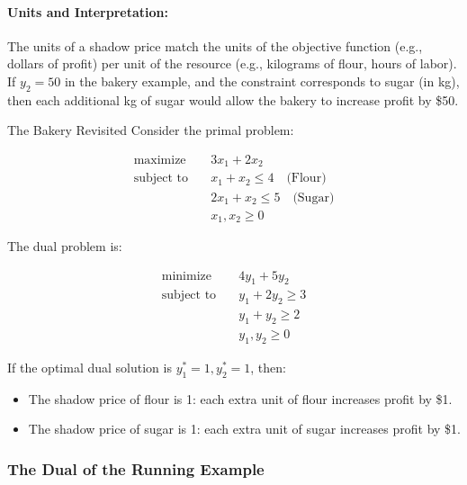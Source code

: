 \paragraph{Units and Interpretation:}
The units of a shadow price match the units of the objective function (e.g., dollars of profit) per unit of the resource (e.g., kilograms of flour, hours of labor). If $y_2 = 50$ in the bakery example, and the constraint corresponds to sugar (in kg), then each additional kg of sugar would allow the bakery to increase profit by \$50.

\begin{example}{The Bakery Revisited}{}
Consider the primal problem:

$$
\begin{aligned}
\text{maximize} \quad & 3x_1 + 2x_2 \\
\text{subject to} \quad
& x_1 + x_2 \leq 4 \quad \text{(Flour)} \\
& 2x_1 + x_2 \leq 5 \quad \text{(Sugar)} \\
& x_1, x_2 \geq 0
\end{aligned}
$$

The dual problem is:

$$
\begin{aligned}
\text{minimize} \quad & 4y_1 + 5y_2 \\
\text{subject to} \quad
& y_1 + 2y_2 \geq 3 \\
& y_1 + y_2 \geq 2 \\
& y_1, y_2 \geq 0
\end{aligned}
$$

If the optimal dual solution is $y_1^* = 1, y_2^* = 1$, then:

\begin{itemize}
\item The shadow price of flour is 1: each extra unit of flour increases profit by \$1.
\item The shadow price of sugar is 1: each extra unit of sugar increases profit by \$1.
\end{itemize}
\end{example}

\subsubsection*{The Dual of the Running Example}

